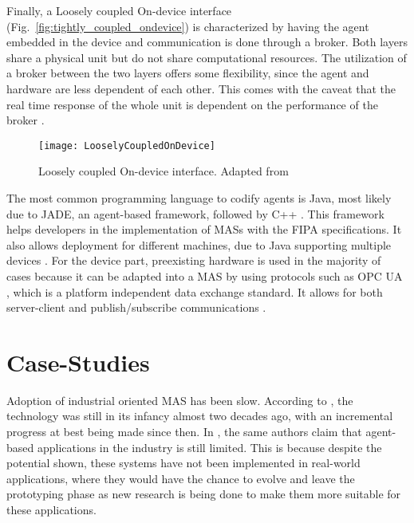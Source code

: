 Finally, a Loosely coupled On-device interface (Fig.~\ref{fig:tightly_coupled_ondevice}) is characterized by having the agent embedded in the device and communication is done through a broker. Both layers share a physical unit but do not share computational resources. The utilization of a broker between the two layers offers some flexibility, since the agent and hardware are less dependent of each other. This comes with the caveat that the real time response of the whole unit is dependent on the performance of the broker \cite{8591641}.

\begin{figure}[hbt!]
	\centering
	\texttt{[image: LooselyCoupledOnDevice]}
	\caption{Loosely coupled On-device interface. Adapted from \cite{8591641}}
	\label{fig:loosely_coupled_ondevice}
\end{figure}


The most common programming language to codify agents is Java, most likely due to JADE, an agent-based framework, followed by C++ \cite{8591641}. This framework helps developers in the implementation of MASs  with the FIPA specifications. It also allows deployment for different machines, due to Java supporting multiple devices \cite{JADE_website}.
For the device part, preexisting hardware is used in the majority of cases because it can be adapted into a MAS by using protocols such as OPC UA \cite{8591641}, which is a platform independent data exchange standard. It allows for both server-client and publish/subscribe communications \cite{OPCUA_website}.


 

\section{Case-Studies}

Adoption of industrial oriented MAS has been slow. According to \cite{karnouskos02}, the technology was still in its infancy almost two decades ago, with an incremental progress at best being made since then. In \cite{Karnouskos2019}, the same authors claim that agent-based applications in the industry is still limited. This is because despite the potential shown, these systems have not been implemented in real-world applications, where they would have the chance to evolve and leave the prototyping phase as new research is being done to make them more suitable for these applications.

